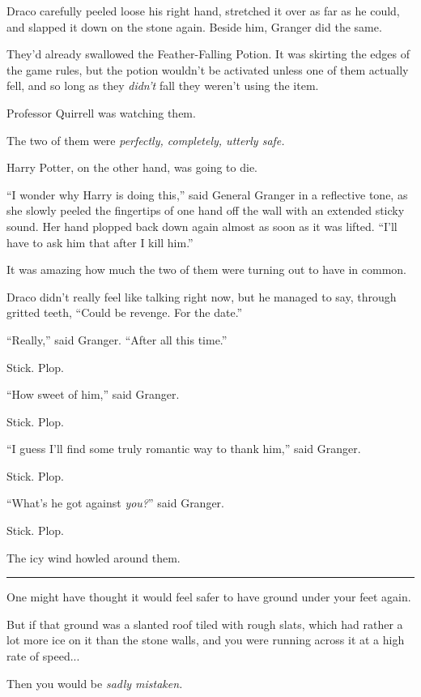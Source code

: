 Draco carefully peeled loose his right hand, stretched it over as far as he could, and slapped it down on the stone again. Beside him, Granger did the same.

They'd already swallowed the Feather-Falling Potion. It was skirting the edges of the game rules, but the potion wouldn't be activated unless one of them actually fell, and so long as they \emph{didn't} fall they weren't using the item.

Professor Quirrell was watching them.

The two of them were \emph{perfectly, completely, utterly safe.}

Harry Potter, on the other hand, was going to die.

``I wonder why Harry is doing this,'' said General Granger in a reflective tone, as she slowly peeled the fingertips of one hand off the wall with an extended sticky sound. Her hand plopped back down again almost as soon as it was lifted. ``I'll have to ask him that after I kill him.''

It was amazing how much the two of them were turning out to have in common.

Draco didn't really feel like talking right now, but he managed to say, through gritted teeth, ``Could be revenge. For the date.''

``Really,'' said Granger. ``After all this time.''

Stick. Plop.

``How sweet of him,'' said Granger.

Stick. Plop.

``I guess I'll find some truly romantic way to thank him,'' said Granger.

Stick. Plop.

``What's he got against \emph{you?}'' said Granger.

Stick. Plop.

The icy wind howled around them.

\begin{center}\rule{3in}{0.4pt}\end{center}

One might have thought it would feel safer to have ground under your feet again.

But if that ground was a slanted roof tiled with rough slats, which had rather a lot more ice on it than the stone walls, and you were running across it at a high rate of speed...

Then you would be \emph{sadly mistaken.}


